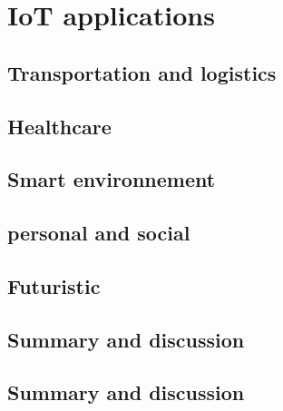 \section{IoT applications}

\subsection{Transportation and logistics}
\subsection{Healthcare}
\subsection{Smart environnement}
\subsection{personal and social}
\subsection{Futuristic}
\subsection{Summary and discussion}


\subsection{Summary and discussion}
